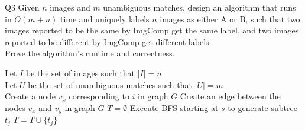 \begin{problem}
  {Q3}
  Given $n$ images and $m$ unambiguous matches, design an algorithm that runs in $O(m+n)$ time and
  uniquely labels $n$ images as either A or B, such that two images reported to be the same by
  ImgComp get the same label, and two images reported to be different by ImgComp get different labels. \\
  Prove the algorithm's runtime and correctness. \\
  \begin{algorithmic}[1]
    \STATE Let $I$ be the set of images such that $|I| = n$ \\
    \STATE Let $U$ be the set of unambiguous matches such that $|U| = m$ \\
    \STATE Create a node $v_x$ corresponding to $i$ in graph $G$
    \ENDFOR
    \STATE Create an edge between the nodes $v_x$ and $v_y$ in graph $G$
    \ENDIF
    \ENDFOR
    \STATE $T = \emptyset$
    \STATE Execute BFS starting at $s$ to generate subtree $t_j$
    \STATE $T = T \cup \{t_j\}$
    \ENDWHILE
  \end{algorithmic}
\end{problem}
